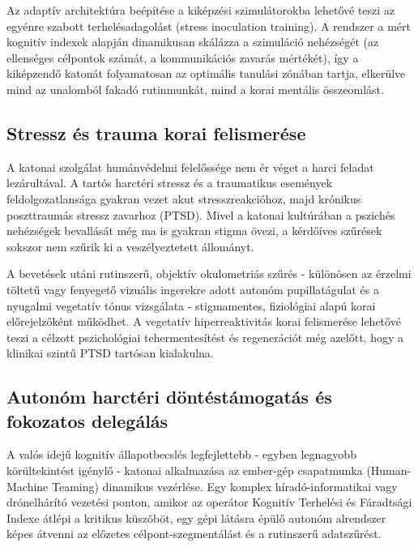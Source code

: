 \documentclass[12pt,a4paper,oneside]{book}
\begin{document}
Az adaptív architektúra beépítése a kiképzési szimulátorokba lehetővé teszi az egyénre szabott terhelésadagolást (stress inoculation training). A rendszer a mért kognitív indexek alapján dinamikusan skálázza a szimuláció nehézségét (az ellenséges célpontok számát, a kommunikációs zavarás mértékét), így a kiképzendő katonát folyamatosan az optimális tanulási zónában tartja, elkerülve mind az unalomból fakadó rutinmunkát, mind a korai mentális összeomlást.

\subsection{Stressz és trauma korai felismerése}

A katonai szolgálat humánvédelmi felelőssége nem ér véget a harci feladat lezárultával. A tartós harctéri stressz és a traumatikus események feldolgozatlansága gyakran vezet akut stresszreakcióhoz, majd krónikus poszttraumás stressz zavarhoz (PTSD). Mivel a katonai kultúrában a pszichés nehézségek bevallását még ma is gyakran stigma övezi, a kérdőíves szűrések sokszor nem szűrik ki a veszélyeztetett állományt.

A bevetések utáni rutinszerű, objektív okulometriás szűrés - különösen az érzelmi töltetű vagy fenyegető vizuális ingerekre adott autonóm pupillatágulat és a nyugalmi vegetatív tónus vizsgálata - stigmamentes, fiziológiai alapú korai előrejelzőként működhet. A vegetatív hiperreaktivitás korai felismerése lehetővé teszi a célzott pszichológiai tehermentesítést és regenerációt még azelőtt, hogy a klinikai szintű PTSD tartósan kialakulna.

\subsection{Autonóm harctéri döntéstámogatás és fokozatos delegálás}

A valós idejű kognitív állapotbecslés legfejlettebb - egyben legnagyobb körültekintést igénylő - katonai alkalmazása az ember-gép csapatmunka (Human-Machine Teaming) dinamikus vezérlése. Egy komplex híradó-informatikai vagy drónelhárító vezetési ponton, amikor az operátor Kognitív Terhelési és Fáradtsági Indexe átlépi a kritikus küszöböt, egy gépi látásra épülő autonóm alrendszer képes átvenni az előzetes célpont-szegmentálást és a rutinszerű adatszűrést.
\end{document}
